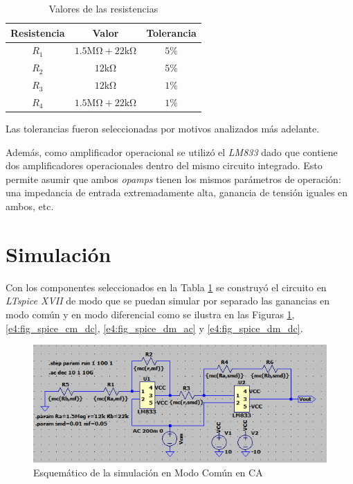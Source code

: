 \begin{table}[ht]
\begin{center}
\begin{tabular}{||c|c|c||}
\hline
Resistencia	&	Valor &	Tolerancia\\
\hline	
$R_1$	&	$1.5\si{\mega\ohm} + 22\si{\kilo\ohm}$	&	$5\%$\\
$R_2$	&	$12\si{\kilo\ohm}$	&	$5\%$\\
$R_3$	&	$12\si{\kilo\ohm}$	&	$1\%$\\
$R_4$	&	$1.5\si{\mega\ohm} + 22\si{\kilo\ohm}$	&	$1\%$\\
\hline
\end{tabular}
\end{center}
\caption{Valores de las resistencias}
\label{e4:tab_res_vals}
\end{table}

Las tolerancias fueron seleccionadas por motivos analizados más adelante.

Además, como amplificador operacional se utilizó el \textit{LM833} dado que contiene dos amplificadores operacionales dentro del mismo circuito integrado. Esto permite asumir que ambos \textit{opamps} tienen los mismos parámetros de operación: una impedancia de entrada extremadamente alta, ganancia de tensión iguales en ambos, etc.

\section{Simulación}

Con los componentes seleccionados en la Tabla \ref{e4:tab_res_vals} se construyó el circuito en \textit{LTspice XVII} de modo que se puedan simular por separado las ganancias en modo común y en modo diferencial como se ilustra en las Figuras \ref{e4:fig_spice_cm_ac}, \ref{e4:fig_spice_cm_dc}, \ref{e4:fig_spice_dm_ac} y \ref{e4:fig_spice_dm_dc}.

\begin{figure}[ht]
\begin{center}
\includegraphics[scale=1]{res/spice/spice_cm_ac_sch.png}
\caption{Esquemático de la simulación en Modo Común en CA}
\label{e4:fig_spice_cm_ac}
\end{center}
\end{figure}

